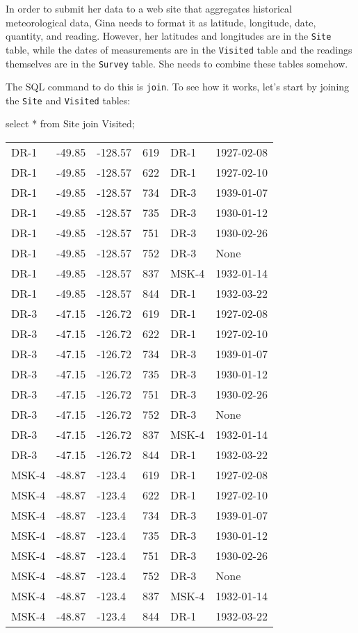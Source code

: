 \documentclass{book}
\begin{document}
In order to submit her data to a web site that aggregates historical
meteorological data, Gina needs to format it as latitude, longitude,
date, quantity, and reading. However, her latitudes and longitudes are
in the \texttt{Site} table, while the dates of measurements are in the
\texttt{Visited} table and the readings themselves are in the
\texttt{Survey} table. She needs to combine these tables somehow.

The SQL command to do this is \texttt{join}. To see how it works, let's
start by joining the \texttt{Site} and \texttt{Visited} tables:

\begin{VerbIn}
\end{VerbIn}

\begin{VerbIn}
select * from Site join Visited;
\end{VerbIn}

\begin{tabular}{llllll}
DR-1 & -49.85 & -128.57 & 619 & DR-1 & 1927-02-08 \\
DR-1 & -49.85 & -128.57 & 622 & DR-1 & 1927-02-10 \\
DR-1 & -49.85 & -128.57 & 734 & DR-3 & 1939-01-07 \\
DR-1 & -49.85 & -128.57 & 735 & DR-3 & 1930-01-12 \\
DR-1 & -49.85 & -128.57 & 751 & DR-3 & 1930-02-26 \\
DR-1 & -49.85 & -128.57 & 752 & DR-3 & None \\
DR-1 & -49.85 & -128.57 & 837 & MSK-4 & 1932-01-14 \\
DR-1 & -49.85 & -128.57 & 844 & DR-1 & 1932-03-22 \\
DR-3 & -47.15 & -126.72 & 619 & DR-1 & 1927-02-08 \\
DR-3 & -47.15 & -126.72 & 622 & DR-1 & 1927-02-10 \\
DR-3 & -47.15 & -126.72 & 734 & DR-3 & 1939-01-07 \\
DR-3 & -47.15 & -126.72 & 735 & DR-3 & 1930-01-12 \\
DR-3 & -47.15 & -126.72 & 751 & DR-3 & 1930-02-26 \\
DR-3 & -47.15 & -126.72 & 752 & DR-3 & None \\
DR-3 & -47.15 & -126.72 & 837 & MSK-4 & 1932-01-14 \\
DR-3 & -47.15 & -126.72 & 844 & DR-1 & 1932-03-22 \\
MSK-4 & -48.87 & -123.4 & 619 & DR-1 & 1927-02-08 \\
MSK-4 & -48.87 & -123.4 & 622 & DR-1 & 1927-02-10 \\
MSK-4 & -48.87 & -123.4 & 734 & DR-3 & 1939-01-07 \\
MSK-4 & -48.87 & -123.4 & 735 & DR-3 & 1930-01-12 \\
MSK-4 & -48.87 & -123.4 & 751 & DR-3 & 1930-02-26 \\
MSK-4 & -48.87 & -123.4 & 752 & DR-3 & None \\
MSK-4 & -48.87 & -123.4 & 837 & MSK-4 & 1932-01-14 \\
MSK-4 & -48.87 & -123.4 & 844 & DR-1 & 1932-03-22 \\
\end{tabular}
\end{document}
